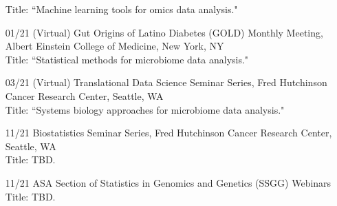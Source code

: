 \documentclass[10pt]{article}
\begin{document}
\begin{enumerate}
Title: {``Machine learning tools for omics data analysis."}
\item[01/21] (Virtual) Gut Origins of Latino Diabetes (GOLD) Monthly Meeting, Albert Einstein College of Medicine, New York, NY\\
Title: {``Statistical methods for microbiome data analysis."}
\item[03/21] (Virtual) Translational Data Science Seminar Series, Fred Hutchinson Cancer Research Center, Seattle, WA\\
Title: {``Systems biology approaches for microbiome data analysis."}
\item[11/21]  Biostatistics Seminar Series, Fred Hutchinson Cancer Research Center, Seattle, WA\\
Title: TBD.
\item[11/21]  ASA Section of Statistics in Genomics and Genetics (SSGG) Webinars\\
Title: TBD.

\end{enumerate}
\end{document}
